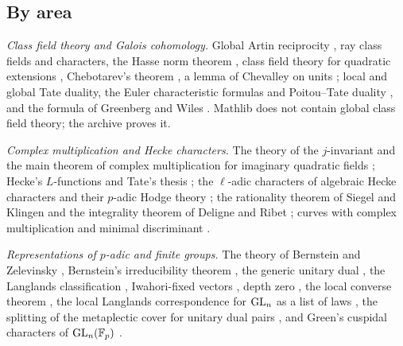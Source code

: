 \subsection{By area}
\emph{Class field theory and Galois cohomology.} Global Artin reciprocity
\cite{takagi1920theorie,artin1927beweis,chevalley1940theorie,tate1967global}, ray class fields
and characters, the Hasse norm theorem \cite{hasse1924darstellbarkeit,hasse1931beweis}, class
field theory for quadratic extensions \cite{hilbert1899theorie}, Chebotarev's theorem
\cite{chebotarev1926bestimmung}, a lemma of Chevalley on units \cite{chevalley1951deux}; local
and global Tate duality, the Euler characteristic formulas and Poitou--Tate duality
\cite{tate1963duality,poitou1966remarques,milne1986arithmetic}, and the formula of Greenberg
and Wiles \cite{wiles1995modular,darmon1995fermat}. Mathlib does not contain global class field
theory; the archive proves it.

\emph{Complex multiplication and Hecke characters.} The theory of the $j$-invariant and the
main theorem of complex multiplication for imaginary quadratic fields
\cite{hasse1927neue,shimura1971introduction}; Hecke's $L$-functions and Tate's thesis
\cite{hecke1918neue,hecke1920neue,tate1967fourier}; the $\ell$-adic characters of algebraic
Hecke characters and their $p$-adic Hodge theory \cite{serre1968abelian}; the rationality
theorem of Siegel and Klingen \cite{klingen1962werte,siegel1969berechnung} and the integrality
theorem of Deligne and Ribet \cite{deligne1980values,cassounogues1979valeurs}; curves with
complex multiplication and minimal discriminant \cite{gross1980arithmetic,gross1982minimal}.

\emph{Representations of $p$-adic and finite groups.} The theory of Bernstein and Zelevinsky
\cite{bernstein1976representations,bernstein1977induced,zelevinsky1980induced}, Bernstein's
irreducibility theorem \cite{bernstein1984pinvariant}, the generic unitary dual
\cite{tadic1986classification}, the Langlands classification \cite{silberger1978langlands},
Iwahori-fixed vectors \cite{borel1976admissible,casselman1980unramified}, depth zero
\cite{moy1994unrefined,moy1996jacquet}, the local converse theorem
\cite{henniart1993caracterisation}, the local Langlands correspondence for $\mathrm{GL}_n$ as a list of
laws \cite{harris2001geometry,henniart2000preuve,scholze2013local}, the splitting of the
metaplectic cover for unitary dual pairs \cite{kudla1994splitting}, and Green's cuspidal
characters of $\mathrm{GL}_n(\mathbb{F}_p)$ \cite{green1955characters,gelfand1970representations}.


